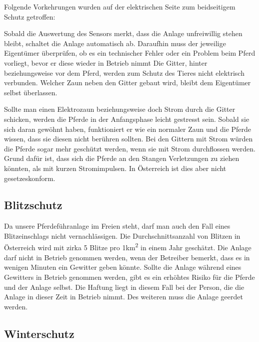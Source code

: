 Folgende Vorkehrungen wurden auf der elektrischen Seite zum beidseitigem Schutz getroffen:

Sobald die Auswertung des Sensors merkt, dass die Anlage unfreiwillig stehen bleibt, schaltet die Anlage automatisch ab. Daraufhin muss der jeweilige Eigentümer überprüfen, ob es ein technischer Fehler oder ein Problem beim Pferd vorliegt, bevor er diese wieder in Betrieb nimmt
Die Gitter, hinter beziehungsweise vor dem Pferd, werden zum Schutz des Tieres nicht elektrisch verbunden.
Welcher Zaun neben den Gitter gebaut wird, bleibt dem Eigentümer selbst überlassen.

Sollte man einen Elektrozaun beziehungsweise doch Strom durch die Gitter schicken, werden die Pferde in der Anfangsphase leicht gestresst sein. Sobald sie sich daran gewöhnt haben, funktioniert er wie ein normaler Zaun und die Pferde wissen, dass sie diesen nicht berühren sollten.
Bei den Gittern mit Strom würden die Pferde sogar mehr geschützt werden, wenn sie mit Strom durchflossen werden. Grund dafür ist, dass sich die Pferde an den Stangen Verletzungen zu ziehen könnten, als mit kurzen Stromimpulsen. In Österreich ist dies aber nicht gesetzeskonform.

\subsection{Blitzschutz}
\label{sec:blitzschutz}

Da unsere Pferdeführanlage im Freien steht, darf man auch den Fall eines Blitzeinschlags nicht vernachlässigen. 
Die Durchschnittsanzahl von Blitzen in Österreich wird mit zirka 5 Blitze pro 1km\textsuperscript{2} in einem Jahr geschätzt. 
Die Anlage darf nicht in Betrieb genommen werden, wenn der Betreiber bemerkt, 
dass es in wenigen Minuten ein Gewitter geben könnte.
Sollte die Anlage während eines Gewitters in Betrieb genommen werden, 
gibt es ein erhöhtes Risiko für die Pferde und der Anlage selbst.
Die Haftung liegt in diesem Fall bei der Person, die die Anlage in dieser Zeit in Betrieb nimmt.
Des weiteren muss die Anlage geerdet werden. 

\subsection{Winterschutz}
\label{sec:winterschutz}

